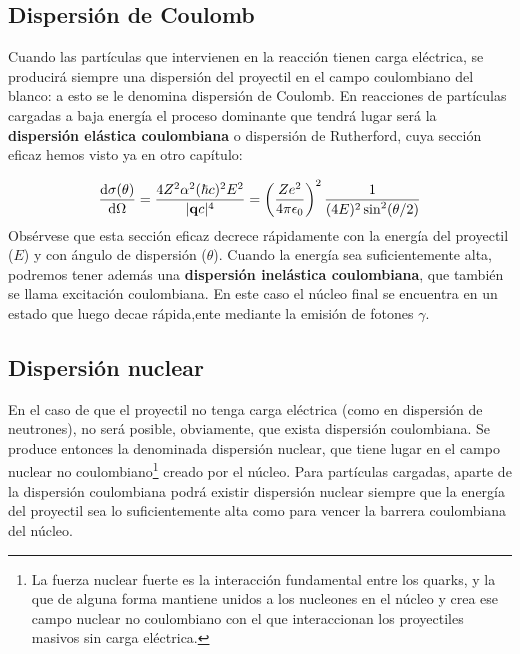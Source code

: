 
\subsection{Dispersión de Coulomb}

Cuando las partículas que intervienen en la reacción tienen carga eléctrica, se producirá siempre una dispersión del proyectil en el campo coulombiano del blanco: a esto se le denomina dispersión de Coulomb. En reacciones de partículas cargadas a baja energía el proceso dominante que tendrá lugar será la \textbf{dispersión elástica coulombiana} o dispersión de Rutherford, cuya sección eficaz hemos visto ya en otro capítulo:

\begin{equation}
    \frac{\mathrm{d} \sigma(\theta)}{\mathrm{d} \Omega} = \frac{4 Z^2 \alpha^2 (\hbar c)^2 E^2}{|\mathbf{q} c|^4} = \left( \frac{Ze^2}{4 \pi \epsilon_0} \right)^2 \frac{1}{(4E)^2 \sin^2(\theta/2)}
\end{equation}
Obsérvese que esta sección eficaz decrece rápidamente con la energía del proyectil ($E$) y con ángulo de dispersión ($\theta$). Cuando la energía sea suficientemente alta, podremos tener además una \textbf{dispersión inelástica coulombiana}, que también se llama excitación coulombiana. En este caso el núcleo final se encuentra en un estado que luego decae rápida,ente mediante la emisión de fotones $\gamma$. 

\subsection{Dispersión nuclear}

En el caso de que el proyectil no tenga carga eléctrica (como en dispersión de neutrones), no será posible, obviamente, que exista dispersión coulombiana. Se produce entonces la denominada dispersión nuclear, que tiene lugar en el campo nuclear no coulombiano\footnote{La fuerza nuclear fuerte es la interacción fundamental entre los quarks, y la que de alguna forma mantiene unidos a los nucleones en el núcleo y crea ese campo nuclear no coulombiano con el que interaccionan los proyectiles masivos sin carga eléctrica.} creado por el núcleo. Para partículas cargadas, aparte de la dispersión coulombiana podrá existir dispersión nuclear siempre que la energía del proyectil sea lo suficientemente alta como para vencer la barrera coulombiana del núcleo. \\


